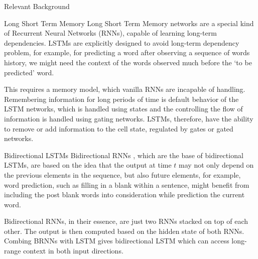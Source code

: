 \documentclass{article}
\begin{document}
\begin{psection}{Relevant Background}

	\begin{psubsection}{Long Short Term Memory}
		Long Short Term Memory \citep[LSTM,][]{lstm} networks are a special kind of Recurrent Neural Networks (RNNs), capable of learning long-term dependencies.
		LSTMs are explicitly designed to avoid long-term dependency problem, for example, for predicting a word after observing a sequence of words history, we might need the context of the words observed much before the `to be predicted' word.

		\sloppy
		This requires a memory model, which vanilla RNNs are incapable of handling. Remembering information for long periods of time is default behavior of the LSTM networks, which is handled using states and the controlling the flow of information is handled using gating networks. LSTMs, therefore, have the ability to remove or add information to the cell state, regulated by gates or gated networks.


		\begin{pssubsection}{Bidirectional LSTMs}
			Bidirectional RNNs \citep[BRNNs,][]{rnn-blog}, which are the base of bidirectional LSTMs, are based on the idea that the output at time $t$ may not only depend on the previous elements in the sequence, but also future elements, for example, word prediction, such as filling in a blank within a sentence, might benefit from including the post blank words into consideration while prediction the current word.

			Bidirectional RNNs, in their essence, are just two RNNs stacked on top of each other.
			The output is then computed based on the hidden state of both RNNs.
			Combing BRNNs with LSTM gives bidirectional LSTM which can access long-range context in both input directions.



\end{pssubsection}
\end{psubsection}
\end{psection}
\end{document}
